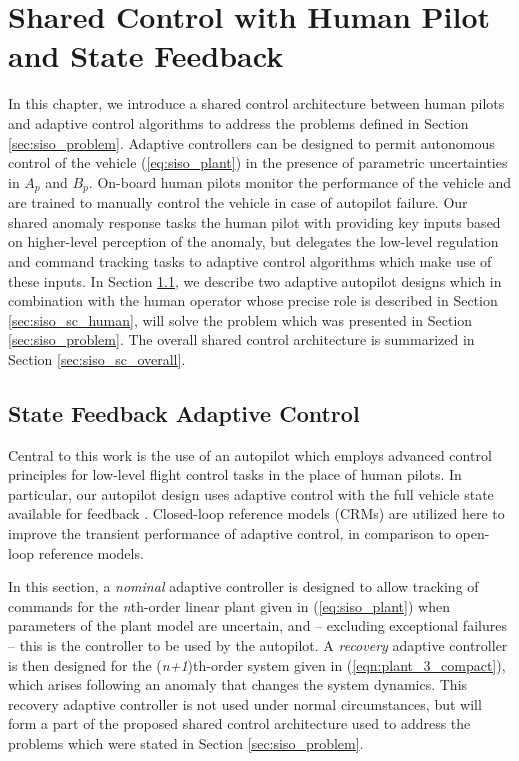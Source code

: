 \chapter{Shared Control with Human Pilot and State Feedback} \label{ch:siso_shared_ctrl}

In this chapter, we introduce a shared control architecture between human pilots and adaptive control algorithms to address the problems defined in Section \ref{sec:siso_problem}. Adaptive controllers can be designed to permit autonomous control of the vehicle (\ref{eq:siso_plant}) in the presence of parametric uncertainties in $A_p$ and $B_p$. On-board human pilots monitor the performance of the vehicle and are trained to manually control the vehicle in case of autopilot failure. Our shared anomaly response tasks the human pilot with providing key inputs based on higher-level perception of the anomaly, but delegates the low-level regulation and command tracking tasks to adaptive control algorithms which make use of these inputs. In Section \ref{sec:siso_sc_adaptive}, we describe two adaptive autopilot designs which in combination with the human operator whose precise role is described in Section \ref{sec:siso_sc_human}, will solve the problem which was presented in Section \ref{sec:siso_problem}. The overall shared control architecture is summarized in Section \ref{sec:siso_sc_overall}.

\section{State Feedback Adaptive Control} \label{sec:siso_sc_adaptive}
Central to this work is the use of an autopilot which employs advanced control principles for low-level flight control tasks in the place of human pilots. In particular, our autopilot design uses adaptive control with the full vehicle state available for feedback \cite{narendra2012stable}. Closed-loop reference models (CRMs) \cite{gibson2013adaptive} are utilized here to improve the transient performance of adaptive control, in comparison to open-loop reference models.

In this section, a \textit{nominal} adaptive controller is designed to allow tracking of commands for the \textit{n}th-order linear plant given in (\ref{eq:siso_plant}) when parameters of the plant model are uncertain, and -- excluding exceptional failures -- this is the controller to be used by the autopilot. A \textit{recovery} adaptive controller is then designed for the (\textit{n+1})th-order system given in (\ref{eqn:plant_3_compact}), which arises following an anomaly that changes the system dynamics. This recovery adaptive controller is not used under normal circumstances, but will form a part of the proposed shared control architecture used to address the problems which were stated in Section \ref{sec:siso_problem}.

